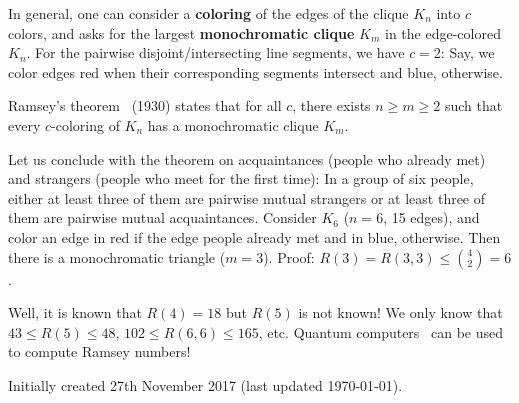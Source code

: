 \documentclass[11pt]{article}
\begin{document}
In general, one can consider a {\bf coloring} of the edges of the clique $K_n$ into $c$ colors, and asks for the largest {\bf monochromatic clique} $K_m$ in the edge-colored $K_n$.
For the pairwise disjoint/intersecting line segments, we have $c=2$: 
Say, we color edges red when their corresponding segments intersect and blue, otherwise.


Ramsey's theorem~\cite{Ramsey-2009} (1930) states that for all $c$, 
there exists $n \geq m\geq 2$ such that every $c$-coloring of $K_n$ has a monochromatic clique $K_m$.

Let us conclude with the theorem on acquaintances (people who already met) and strangers (people who meet for the first time):
In a group of six people, either at least three of them are pairwise mutual strangers or at least three of them are pairwise mutual acquaintances.
Consider $K_6$ ($n=6$, 15 edges), and color an edge in red if the edge people  already met and in blue, otherwise.
Then there is a monochromatic triangle ($m=3$). 
Proof: $R(3)=R(3,3)\leq \binom{4}{2}=6$.

Well, it is known that $R(4)=18$ but $R(5)$ is not known! We only know that $43\leq R(5)\leq 48$, $102\leq R(6,6)\leq 165$, etc.
Quantum computers~\cite{QRamsey-2016} can be used to compute Ramsey numbers!


\vskip 1cm
Initially created 27th November 2017 (last updated \today).



\end{document}
